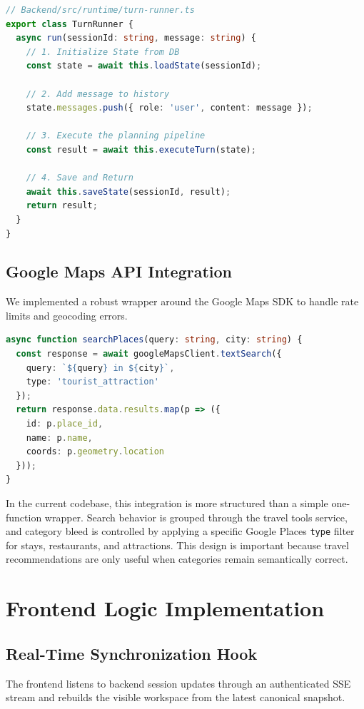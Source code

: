 \documentclass[12pt,a4paper]{report}
\begin{document}
\begin{lstlisting}[language=TypeScript, caption={Implementation of the Core TurnRunner}, label={lst:turn_runner_code}]
// Backend/src/runtime/turn-runner.ts
export class TurnRunner {
  async run(sessionId: string, message: string) {
    // 1. Initialize State from DB
    const state = await this.loadState(sessionId);
    
    // 2. Add message to history
    state.messages.push({ role: 'user', content: message });
    
    // 3. Execute the planning pipeline
    const result = await this.executeTurn(state);
    
    // 4. Save and Return
    await this.saveState(sessionId, result);
    return result;
  }
}
\end{lstlisting}

\subsection{Google Maps API Integration}
We implemented a robust wrapper around the Google Maps SDK to handle rate limits and geocoding errors.

\begin{lstlisting}[language=TypeScript, caption={Google Maps Search Wrapper}, label={lst:maps_impl}]
async function searchPlaces(query: string, city: string) {
  const response = await googleMapsClient.textSearch({
    query: `${query} in ${city}`,
    type: 'tourist_attraction'
  });
  return response.data.results.map(p => ({
    id: p.place_id,
    name: p.name,
    coords: p.geometry.location
  }));
}
\end{lstlisting}

In the current codebase, this integration is more structured than a simple one-function wrapper. Search behavior is grouped through the travel tools service, and category bleed is controlled by applying a specific Google Places \texttt{type} filter for stays, restaurants, and attractions. This design is important because travel recommendations are only useful when categories remain semantically correct.

\section{Frontend Logic Implementation}

\subsection{Real-Time Synchronization Hook}
The frontend listens to backend session updates through an authenticated SSE stream and rebuilds the visible workspace from the latest canonical snapshot.
\end{document}
